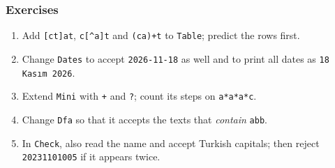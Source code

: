 \documentclass[aspectratio=169,10pt,compress]{beamer}
\begin{document}
\begin{frame}[t,fragile] \frametitle{Exercises}
  \begin{enumerate}\small
    \item Add \texttt{[ct]at}, \texttt{c[\textasciicircum a]t} and \texttt{(ca)+t} to \texttt{Table}; predict the rows first.
    \item Change \texttt{Dates} to accept \texttt{2026-11-18} as well and to print all dates as \texttt{18 Kasım 2026}.
    \item Extend \texttt{Mini} with \texttt{+} and \texttt{?}; count its steps on \texttt{a*a*a*c}.
    \item Change \texttt{Dfa} so that it accepts the texts that \emph{contain} \texttt{abb}.
    \item In \texttt{Check}, also read the name and accept Turkish capitals; then reject \texttt{20231101005} if it appears twice.
  \end{enumerate}
\end{frame}




\begin{frame}[t,fragile]
	\begin{center}
		\vspace{4cm}
	\end{center}
\end{frame}
\end{document}
